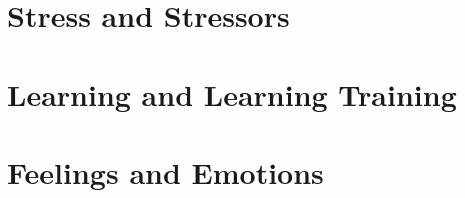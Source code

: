 \documentclass[makeidx]{book}
\begin{document}
\doparttoc
\frontmatter



% 


\mainmatter
\part{Stress and Stressors}
\parttoc


\part{Learning and Learning Training}

\parttoc


\part{Feelings and Emotions}

\parttoc




% 




{}

\backmatter
\printindex
\end{document}
